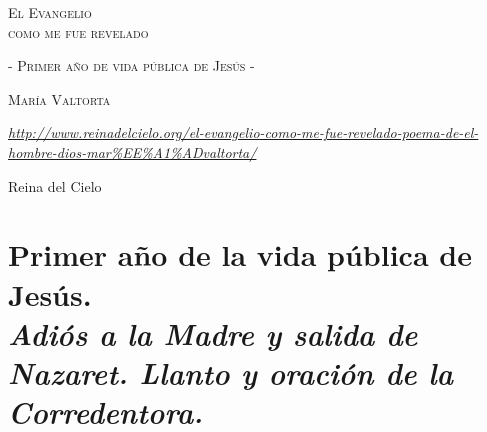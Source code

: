 \documentclass[12pt, twoside, openright]{book} %
\begin{document}
\begin{titlepage}
\centering
\vspace{3.5cm}
{\scshape\LARGE El Evangelio\\como me fue revelado\par}
{\scshape - Primer año de vida pública de Jesús - \par}
\vfill
{\scshape\Large María Valtorta \par}
\vfill
{\itshape \url{http://www.reinadelcielo.org/el-evangelio-como-me-fue-revelado-poema-de-el-hombre-dios-mar%EE%A1%ADvaltorta/} \par}
\vfill
Reina del Cielo
\end{titlepage}

\frenchspacing
\chapter*{Primer año de la vida pública de Jesús. \\ \normalfont\normalsize\textit{Adiós a la Madre y salida de Nazaret. Llanto y oración de la Corredentora.}}
 
\end{document}
